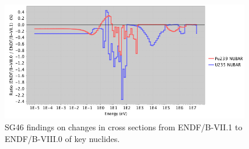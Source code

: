 \documentclass[letterpaper]{ar-1col}
\newcommand{\subfigimg}[4][,]{%
  \setbox1=\hbox{\noindent\texttt{[image: \#3]}}%
  \leavevmode\rlap{\usebox1}%
  \rlap{\hspace*{#4pt}\raisebox{\dimexpr\ht1-2\baselineskip}{#2}}%
  \phantom{\usebox1}%
}
\begin{document}
\begin{figure}
\begin{minipage}{0.5\textwidth}
    \end{minipage}\hfill
    \begin{minipage}{0.5\textwidth}
        \centering
        \includegraphics[width=0.97\textwidth]{pu239_2.png} %
    \end{minipage}
    \caption{SG46 findings on changes in cross sections from ENDF/B-VII.1 to ENDF/B-VIII.0 of key nuclides. }
     \label{fig:ne_plots}
\end{figure}

\end{document}
